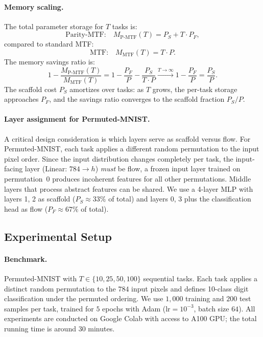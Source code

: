 \documentclass{article}
\begin{document}
\paragraph{Memory scaling.}
The total parameter storage for $T$ tasks is:
\begin{equation}
    \text{Parity-MTF:} \quad M_{\text{P-MTF}}(T) = P_S + T \cdot P_F,
\end{equation}
compared to standard MTF:
\begin{equation}
    \text{MTF:} \quad M_{\text{MTF}}(T) = T \cdot P.
\end{equation}
The memory savings ratio is:
\begin{equation}
    1 - \frac{M_{\text{P-MTF}}(T)}{M_{\text{MTF}}(T)} = 1 - \frac{P_F}{P} - \frac{P_S}{T \cdot P} \xrightarrow{T \to \infty} 1 - \frac{P_F}{P} = \frac{P_S}{P}.
    \label{eq:amortization}
\end{equation}
The scaffold cost $P_S$ amortizes over tasks: as $T$ grows, the per-task storage approaches $P_F$, and the savings ratio converges to the scaffold fraction $P_S / P$.

\paragraph{Layer assignment for Permuted-MNIST.}
A critical design consideration is which layers serve as scaffold versus flow.
For Permuted-MNIST, each task applies a different random permutation to the input pixel order.
Since the input distribution changes completely per task, the input-facing layer (Linear: $784 \to h$) \emph{must} be flow, a frozen input layer trained on permutation~0 produces incoherent features for all other permutations.
Middle layers that process abstract features can be shared.
We use a 4-layer MLP with layers 1, 2 as scaffold ($P_S \approx 33\%$ of total) and layers 0, 3 plus the classification head as flow ($P_F \approx 67\%$ of total).

\subsection{Experimental Setup}

\paragraph{Benchmark.}
Permuted-MNIST with $T \in \{10, 25, 50, 100\}$ sequential tasks.
Each task applies a distinct random permutation to the $784$ input pixels and defines 10-class digit classification under the permuted ordering.
We use $1{,}000$ training and $200$ test samples per task, trained for $5$ epochs with Adam ($\text{lr} = 10^{-3}$, batch size $64$). All experiments are conducted on Google Colab with access to A100 GPU; the total running time is around 30 minutes.
\end{document}
